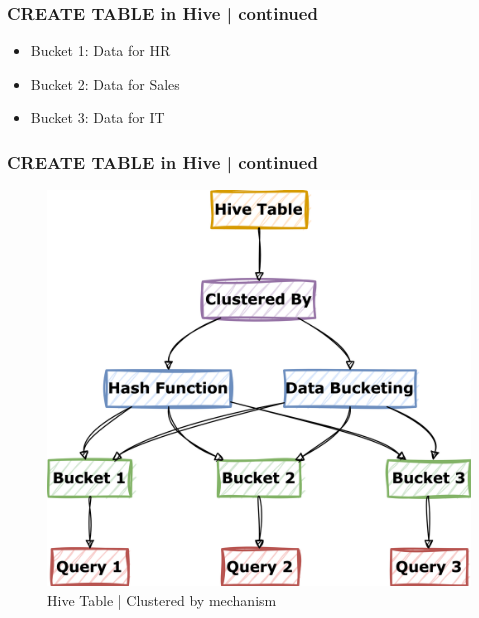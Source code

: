 \begin{frame}
\frametitle{CREATE TABLE in Hive | continued}
\begin{tcolorbox}[colback=white,colframe=black,title= Part 6: Clustering and Sorting | CLUSTERED BY]
	\begin{itemize}
		\item Bucket 1: Data for HR
		\item Bucket 2: Data for Sales
		\item Bucket 3: Data for IT
	\end{itemize}
\end{tcolorbox}
\end{frame}
\begin{frame}
	\frametitle{CREATE TABLE in Hive | continued}		
	\vspace{-0.5cm}
	\begin{tcolorbox}[colback=white,colframe=black,title= Part 6: Clustering and Sorting | CLUSTERED BY]
		\vspace{-0.2cm}
		\begin{figure}
			\includegraphics[width=\textwidth,height=.6\textheight,keepaspectratio]{./Figures/chapter-03/mermaid-diagram-hive_db_clustered_by.png}				
			\caption{Hive Table | Clustered by mechanism}	
		\end{figure}
	\end{tcolorbox}				
\end{frame}
